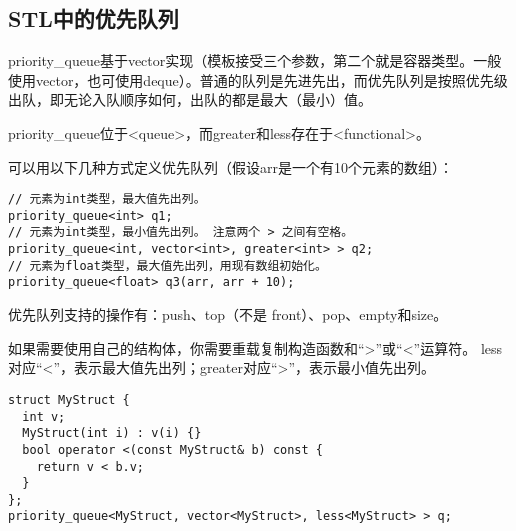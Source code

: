 \subsection{STL中的优先队列}

priority\_queue基于vector实现（模板接受三个参数，第二个就是容器类型。一般使用vector，也可使用deque）。普通的队列是先进先出，而优先队列是按照优先级出队，即无论入队顺序如何，出队的都是最大（最小）值。

priority\_queue位于<queue>，而greater和less存在于<functional>。

可以用以下几种方式定义优先队列（假设arr是一个有10个元素的数组）：

\begin{lstlisting}
// 元素为int类型，最大值先出列。
priority_queue<int> q1;
// 元素为int类型，最小值先出列。 注意两个 > 之间有空格。
priority_queue<int, vector<int>, greater<int> > q2;
// 元素为float类型，最大值先出列，用现有数组初始化。
priority_queue<float> q3(arr, arr + 10);
\end{lstlisting}

优先队列支持的操作有：push、top（不是 front）、pop、empty和size。

如果需要使用自己的结构体，你需要重载复制构造函数和“>”或“<”运算符。 less对应“<”，表示最大值先出列；greater对应“>”，表示最小值先出列。

\begin{lstlisting}
struct MyStruct {
  int v;
  MyStruct(int i) : v(i) {}
  bool operator <(const MyStruct& b) const {
    return v < b.v;
  }
};
priority_queue<MyStruct, vector<MyStruct>, less<MyStruct> > q;
\end{lstlisting}
